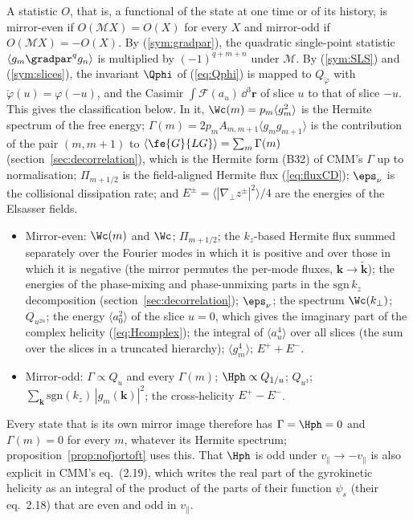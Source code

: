 A statistic $O$, that is, a functional of the state at one time or of its history, is mirror-even if $O(\mathcal MX)=O(X)$ for every $X$ and mirror-odd if $O(\mathcal MX)=-O(X)$. By (\ref{sym:gradpar}), the quadratic single-point statistic $\langle g_m\gradpar^qg_n\rangle$ is multiplied by $(-1)^{q+m+n}$ under $\mathcal M$. By (\ref{sym:SLS}) and (\ref{sym:slices}), the invariant $\Qphi$ of (\ref{eq:Qphi}) is mapped to $Q_{\check\varphi}$ with $\check\varphi(u)=\varphi(-u)$, and the Casimir $\int\mathcal F(a_u)\,\dd^3\boldsymbol r$ of slice $u$ to that of slice $-u$. This gives the classification below. In it, $\Wc(m)=p_m\langle g_m^2\rangle$ is the Hermite spectrum of the free energy; $\Gamma(m)=2p_mA_{m,m+1}\langle g_mg_{m+1}\rangle$ is the contribution of the pair $(m,m+1)$ to $\langle\fe{G}{LG}\rangle=\sum_m\Gamma(m)$ (section~\ref{sec:decorrelation}), which is the Hermite form (B32) of CMM's $\Gamma$ up to normalisation; $\Pi_{m+1/2}$ is the field-aligned Hermite flux (\ref{eq:fluxCD}); $\eps_\nu$ is the collisional dissipation rate; and $E^\pm=\langle|\nabla_\perp z^\pm|^2\rangle/4$ are the energies of the Elsasser fields.
\begin{itemize}
  \item Mirror-even: $\Wc(m)$ and $\Wc$; $\Pi_{m+1/2}$; the $k_z$-based Hermite flux summed separately over the Fourier modes in which it is positive and over those in which it is negative (the mirror permutes the per-mode fluxes, $\boldsymbol k\to\tilde{\boldsymbol k}$); the energies of the phase-mixing and phase-unmixing parts in the $\mathrm{sgn}\,k_z$ decomposition (section~\ref{sec:decorrelation}); $\eps_\nu$; the spectrum $\Wc(k_\perp)$; $Q_{u^{2n}}$; the energy $\langle a_0^2\rangle$ of the slice $u=0$, which gives the imaginary part of the complex helicity (\ref{eq:Hcomplex}); the integral of $\langle a_u^4\rangle$ over all slices (the sum over the slices in a truncated hierarchy); $\langle g_m^4\rangle$; $E^++E^-$.
  \item Mirror-odd: $\Gamma\propto Q_u$ and every $\Gamma(m)$; $\Hph\propto Q_{1/u}$; $Q_{u^3}$; $\sum_{\boldsymbol k}\mathrm{sgn}(k_z)\,|g_m(\boldsymbol k)|^2$; the cross-helicity $E^+-E^-$.
\end{itemize}
Every state that is its own mirror image therefore has $\Gamma=\Hph=0$ and $\Gamma(m)=0$ for every $m$, whatever its Hermite spectrum; proposition~\ref{prop:nofjortoft} uses this. That $\Hph$ is odd under $v_\parallel\to-v_\parallel$ is also explicit in CMM's eq.~(2.19), which writes the real part of the gyrokinetic helicity as an integral of the product of the parts of their function $\psi_s$ (their eq.~2.18) that are even and odd in $v_\parallel$.


